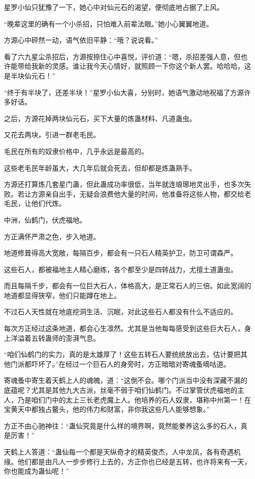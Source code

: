 \begin{this_body}
星罗小仙只犹豫了一下，她心中对仙元石的渴望，便彻底地占据了上风。

“晚辈这里的确有一个小杀招，只怕难入前辈法眼。”她小心翼翼地道。

方源心中砰然一动，语气依旧平静：“哦？说说看。”

看了六九星尘杀招后，方源按捺住心中喜悦，评价道：“嗯，杀招差强人意，但也许能带给我新的灵感。谁让我今天心情好，就照顾一下你这个新人罢。哈哈哈，这是半块仙元石！”

“终于有半块了，还差半块！”星罗小仙大喜，分别时，她语气激动地祝福了方源许多好话。

之后，方源花掉两块仙元石，买下大量的炼蛊材料、凡道蛊虫。

又花去两块，引进一群老毛民。

毛民在所有的奴隶价格中，几乎永远是最高的。

这些老毛民年龄虽大，大几年后就会死去，但却都是炼蛊熟手。

方源还打算炼几套星门蛊，但此蛊成功率很低，当年就连琅琊地灵出手，也多次失败。若让方源亲自出手，无疑会浪费他大量的时间，他准备将这些人物，都交给老毛民，让他们代炼。

中洲，仙鹤门，伏虎福地。

方正满怀严肃之色，步入地道。

地道修葺得高大宽敞，每隔百步，都会有一只石人精英护卫，防卫可谓森严。

这些石人，都被福地主人精心磨练，各个都至少是四转战力，尤擅土道蛊虫。

而且每隔千步，都会有一位巨大石人，体格高大，是正常石人的三倍。如此宽阔的地道都显得狭窄，他们只能蹲在地上。

不过石人天性就在地底挖洞生活、沉眠，对此这些石人都没有什么不适应的。

每次方正经过这条地道，都会心生凛然。尤其是当他每每感受到这些巨大石人，身上洋溢着五转蛊师的澎湃气息。

“咱们仙鹤门的实力，真的是太雄厚了！这些五转石人要统统放出去，估计要把其他门派都吓坏了。”在经过一个巨石人的身旁时，方正暗暗对寄魂蚤嘀咕道。

寄魂蚤中寄生着天鹤上人的魂魄，道：“这倒不会。哪个门派当中没有深藏不漏的底蕴呢？尤其是其他九大古派，丝毫不弱于咱们仙鹤门。不过掌管伏虎福地的主人，乃是咱们门中的太上三长老虎魔上人。他培养的石人奴隶，堪称中州第一！在宝黄天中都独占鳌头，他的伟力和财富，非你我这些凡人能够想象。”

方正不由心驰神往：“蛊仙究竟是什么样的境界啊，竟然能豢养这么多的石人，真是厉害！”

天鹤上人答道：“蛊仙每一个都是天纵奇才的精英俊杰，人中龙凤，各有奇遇机缘。他们都是由凡人一步步修行上去的，方正你也已经是五转，也许将来有一天，你也能成为蛊仙呢！”


\end{this_body}
